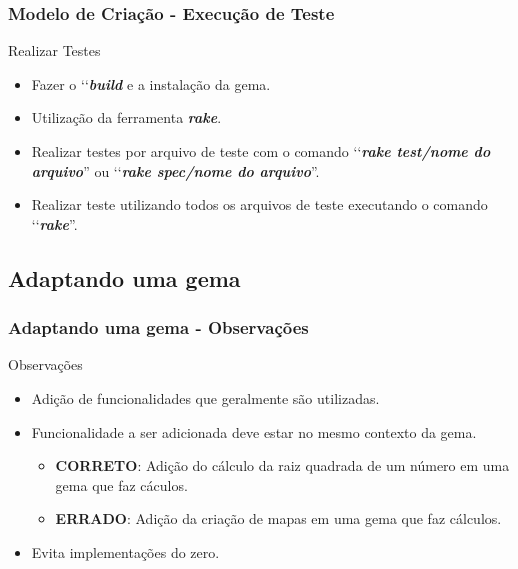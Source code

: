 \begin{frame}
\frametitle{Modelo de Criação - Execução de Teste}

  \begin{block}{Realizar Testes}

   \begin{itemize}

   \item Fazer o ‘‘\emph{\textbf{build}} e a instalação da gema.

    \item Utilização da ferramenta \emph{\textbf{rake}}.

    \item Realizar testes por arquivo de teste com o comando ‘‘\emph{\textbf{rake test/nome do arquivo}}'' ou
    ‘‘\emph{\textbf{rake spec/nome do arquivo}}''.

    \item Realizar teste utilizando todos os arquivos de teste executando o comando ‘‘\emph{\textbf{rake}}''.

   \end{itemize}

  \end{block}

\end{frame}


\subsection{Adaptando uma gema}
\begin{frame}
\frametitle{Adaptando uma gema - Observações}

  \begin{block}{Observações}

   \begin{itemize}

    \item Adição de funcionalidades que geralmente são utilizadas.

    \item Funcionalidade a ser adicionada deve estar no mesmo contexto da gema.

     \begin{itemize}

      \item \textbf{CORRETO}: Adição do cálculo da raiz quadrada de um número em uma gema que faz cáculos.

      \item \textbf{ERRADO}: Adição da criação de mapas em uma gema que faz cálculos.

     \end{itemize}

    \item Evita implementações do zero.

   \end{itemize}

  \end{block}

\end{frame}


